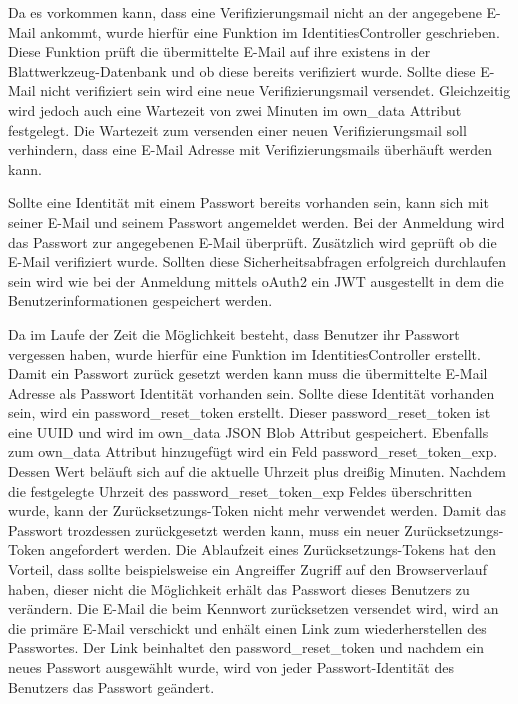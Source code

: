 \documentclass[paper=a4,fontsize=12pt,parskip=half]{scrartcl}
\begin{document}
\begin{description}
		Da es vorkommen kann, dass eine Verifizierungsmail nicht an der angegebene E-Mail ankommt, wurde hierfür eine Funktion im IdentitiesController geschrieben. Diese Funktion prüft die übermittelte E-Mail auf ihre existens in der Blattwerkzeug-Datenbank und ob diese bereits verifiziert wurde. Sollte diese E-Mail nicht verifiziert sein wird eine neue Verifizierungsmail versendet. Gleichzeitig wird jedoch auch eine Wartezeit von zwei Minuten im own\_data Attribut festgelegt. Die Wartezeit zum versenden einer neuen Verifizierungsmail soll verhindern, dass eine E-Mail Adresse mit Verifizierungsmails überhäuft werden kann.

		Sollte eine Identität mit einem Passwort bereits vorhanden sein, kann sich mit seiner E-Mail und seinem Passwort angemeldet werden. Bei der Anmeldung wird das Passwort zur angegebenen E-Mail überprüft. Zusätzlich wird geprüft ob die E-Mail verifiziert wurde. Sollten diese Sicherheitsabfragen erfolgreich durchlaufen sein wird wie bei der Anmeldung mittels \gls{oAuth2} ein \gls{JWT} ausgestellt in dem die Benutzerinformationen gespeichert werden.

		Da im Laufe der Zeit die Möglichkeit besteht, dass Benutzer ihr Passwort vergessen haben, wurde hierfür eine Funktion im IdentitiesController erstellt. Damit ein Passwort zurück gesetzt werden kann muss die übermittelte E-Mail Adresse als Passwort Identität vorhanden sein. Sollte diese Identität vorhanden sein, wird ein password\_reset\_token erstellt. Dieser password\_reset\_token ist eine \gls{UUID} und wird im own\_data JSON Blob Attribut gespeichert. Ebenfalls zum own\_data Attribut hinzugefügt wird ein Feld password\_reset\_token\_exp. Dessen Wert beläuft sich auf die aktuelle Uhrzeit plus dreißig Minuten. Nachdem die festgelegte Uhrzeit des password\_reset\_token\_exp Feldes überschritten wurde, kann der Zurücksetzungs-Token nicht mehr verwendet werden. Damit das Passwort trozdessen zurückgesetzt werden kann, muss ein neuer Zurücksetzungs-Token angefordert werden. Die Ablaufzeit eines Zurücksetzungs-Tokens hat den Vorteil, dass sollte beispielsweise ein Angreiffer Zugriff auf den Browserverlauf haben, dieser nicht die Möglichkeit erhält das Passwort dieses Benutzers zu verändern. Die E-Mail die beim Kennwort zurücksetzen versendet wird, wird an die primäre E-Mail verschickt und enhält einen Link zum wiederherstellen des Passwortes. Der Link beinhaltet den password\_reset\_token und nachdem ein neues Passwort ausgewählt wurde, wird von jeder Passwort-Identität des Benutzers das Passwort geändert.
	\end{description}
\end{document}
